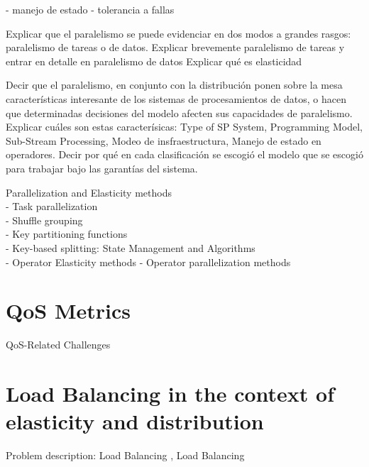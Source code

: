   - manejo de estado
  - tolerancia a fallas


















  Explicar que el paralelismo se puede evidenciar en dos modos a grandes
  rasgos: paralelismo de tareas o de datos. Explicar brevemente paralelismo de
  tareas y entrar en detalle en paralelismo de datos
  Explicar qué es elasticidad

  Decir que el paralelismo, en conjunto con la distribución ponen sobre la mesa
  características interesante de los sistemas de procesamientos de datos, o
  hacen que determinadas decisiones del modelo afecten sus capacidades de
  paralelismo. Explicar cuáles son estas caracterísicas: Type of SP System,
  Programming Model, Sub-Stream Processing, Modeo de insfraestructura, Manejo
  de estado en operadores. \cite{R_ger_2019} Decir por qué en cada
  clasificación se escogió el modelo que se escogió para trabajar bajo las
  garantías del sistema.


  Parallelization and Elasticity methods \cite{R_ger_2019}\\
  - Task parallelization \cite{R_ger_2019}\\
  - Shuffle grouping \cite{R_ger_2019}\\
  - Key partitioning functions \cite{R_ger_2019}\\
  - Key-based splitting: State Management and Algorithms \cite{R_ger_2019}\\
  - Operator Elasticity methods \cite{R_ger_2019}
  - Operator parallelization methods \cite{R_ger_2019}


  \section{QoS Metrics}
  QoS-Related Challenges\cite{chakravarthy2009stream}
  \section{Load Balancing in the context of elasticity and distribution}

  Problem description: Load Balancing  \cite{Hirzel_2014},   Load Balancing \cite{R_ger_2019}

